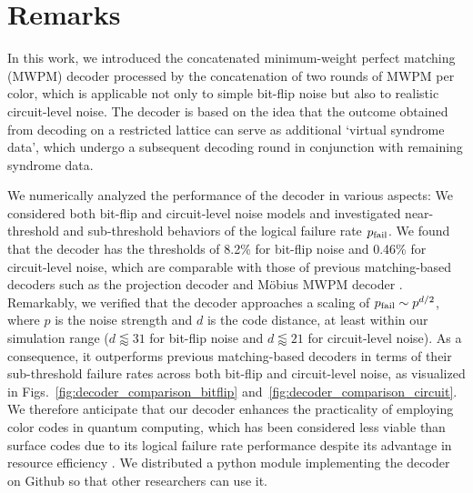 \documentclass[a4paper,twocolumn,11pt,accepted=2025-01-21]{quantumarticle}
\theoremstyle{definition}
\theoremstyle{definition}
\theoremstyle{definition}
\begin{document}
\section{Remarks \label{sec:remarks}}

In this work, we introduced the concatenated minimum-weight perfect matching (MWPM) decoder processed by the concatenation of two rounds of MWPM per color, which is applicable not only to simple bit-flip noise but also to realistic circuit-level noise.
The decoder is based on the idea that the outcome obtained from decoding on a restricted lattice can serve as additional `virtual syndrome data', which undergo a subsequent decoding round in conjunction with remaining syndrome data.

We numerically analyzed the performance of the decoder in various aspects: We considered both bit-flip and circuit-level noise models and investigated near-threshold and sub-threshold behaviors of the logical failure rate $p_{\mathrm{fail}}$.
We found that the decoder has the thresholds of 8.2\% for bit-flip noise and 0.46\% for circuit-level noise, which are comparable with those of previous matching-based decoders such as the projection decoder \cite{delfosse2014decoding,chamberland2020triangular,beverland2021cost,kubica2023efficient,zhang2024facilitating} and Möbius MWPM decoder \cite{sahay2022decoder,gidney2023new}.
Remarkably, we verified that the decoder approaches a scaling of $p_{\mathrm{fail}} \sim p^{d/2}$, where $p$ is the noise strength and $d$ is the code distance, at least within our simulation range ($d \lessapprox 31$ for bit-flip noise and $d \lessapprox 21$ for circuit-level noise).
As a consequence, it outperforms previous matching-based decoders in terms of their sub-threshold failure rates across both bit-flip and circuit-level noise, as visualized in Figs.~\ref{fig:decoder_comparison_bitflip} and~\ref{fig:decoder_comparison_circuit}.
We therefore anticipate that our decoder enhances the practicality of employing color codes in quantum computing, which has been considered less viable than surface codes due to its logical failure rate performance despite its advantage in resource efficiency \cite{thomsen2024lowoverhead}.
We distributed a python module implementing the decoder on Github \cite{colorcodestim} so that other researchers can use it.
\end{document}
